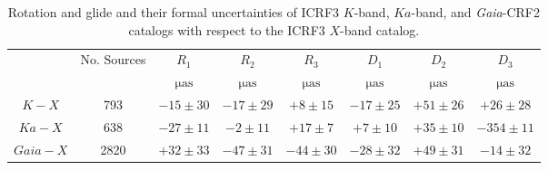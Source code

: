 \documentclass{aa-note}   %
\begin{document}
%
\begin{table}[htbp]
    \centering
    \caption{\label{tab:vsh01}
        Rotation and glide and their formal uncertainties of ICRF3 $K$-band, $Ka$-band, and \textit{Gaia}-CRF2 catalogs with respect to the ICRF3 $X$-band catalog.
    }
    \begin{tabular}{cccccccc}
        \hline \noalign{\smallskip}
        &No. Sources & $R_1$ & $R_2$ & $R_3$ & $D_1$ & $D_2$ & $D_3$ \\
        & & $\mathrm{\mu as}$ & $\mathrm{\mu as}$  & $\mathrm{\mu as}$ & $\mathrm{\mu as}$ & $\mathrm{\mu as}$& $\mathrm{\mu as}$ \\
        \noalign{\smallskip}
        \hline 
        \noalign{\smallskip}
        $K - X$    & 793 &$ -15\pm  30$  &$-17 \pm  29$ &$+ 8 \pm  15$ &$-17 \pm  25$ &$+51 \pm  26$ &$+26 \pm  28$ \\
        $Ka - X$   & 638 &$ -27\pm  11$  &$- 2 \pm  11$ &$+17 \pm   7$ &$+ 7 \pm  10$ &$+35 \pm  10$ &$-354\pm  11$ \\
        $Gaia - X$ &2820 &$ +32 \pm 33$  &$-47 \pm  31$ &$-44 \pm  30$ &$-28 \pm  32$ &$+49 \pm  31$ &$-14 \pm  32$ \\
        \hline
    \end{tabular}
\end{table}
%
\end{document}
